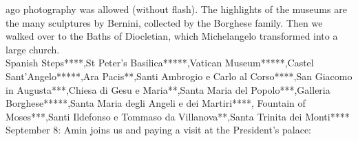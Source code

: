 ago photography was allowed (without flash). The highlights of the museums are the many sculptures by Bernini, collected by the Borghese family. Then we walked over to the Baths of Diocletian, which Michelangelo transformed into a large church.\\

Spanish Steps****,St Peter's Basilica*****,Vatican Museum*****,Castel Sant'Angelo*****,Ara Pacis**,Santi Ambrogio e Carlo al Corso****,San Giacomo in Augusta***,Chiesa di Gesu e Maria**,Santa Maria del Popolo***,Galleria Borghese*****,Santa Maria degli Angeli e dei Martiri****, Fountain of Moses***,Santi Ildefonso e Tommaso da Villanova**,Santa Trinita dei Monti****\\

September 8: Amin joins us and paying a visit at the President's palace:\\
